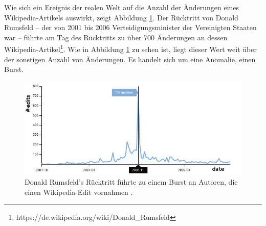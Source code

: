 Wie sich ein Ereignis der realen Welt auf die Anzahl der Änderungen eines Wikipedia-Artikels auswirkt, zeigt Abbildung \ref{fig:donald_rumsfelds_resignation_burst}.
Der Rücktritt von Donald Rumsfeld -- der von 2001 bis 2006 Verteidigungsminister der Vereinigten Staaten war -- führte am Tag des Rücktritts
zu über 700 Änderungen an dessen Wikipedia-Artikel\footnote{https://de.wikipedia.org/wiki/Donald\_Rumsfeld}. Wie in Abbildung \ref{fig:donald_rumsfelds_resignation_burst}
zu sehen ist, liegt dieser Wert weit über der sonstigen Anzahl von Änderungen. Es handelt sich um eine Anomalie, einen Burst.

\begin{figure}[h]
    \includegraphics[width=.5\textwidth]{images/Extracting_EventRelated_Information_from_Article.jpg}
    \caption{Donald Rumsfeld’s Rücktritt führte zu einem Burst an Autoren, die einen Wikipedia-Edit vornahmen \cite{10.1007978-3-642-36973-5_22}.}
    \label{fig:donald_rumsfelds_resignation_burst}
\end{figure}